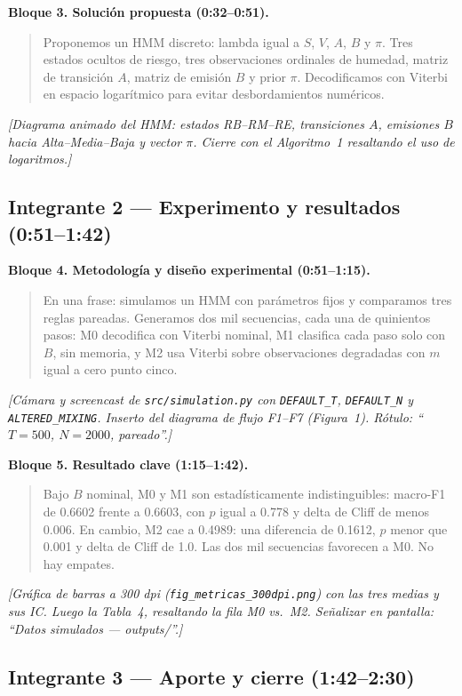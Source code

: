 \documentclass[11pt,letterpaper]{article}
\begin{document}
\medskip
\textbf{Bloque 3. Solución propuesta (0:32--0:51).}
\begin{quote}\small
Proponemos un HMM discreto: lambda igual a $S$, $V$, $A$, $B$ y $\pi$. Tres estados ocultos de riesgo, tres observaciones ordinales de humedad, matriz de transición $A$, matriz de emisión $B$ y prior $\pi$. Decodificamos con Viterbi en espacio logarítmico para evitar desbordamientos numéricos.
\end{quote}
\noindent\emph{[Diagrama animado del HMM: estados RB--RM--RE, transiciones $A$, emisiones $B$ hacia Alta--Media--Baja y vector $\pi$. Cierre con el Algoritmo~1 resaltando el uso de logaritmos.]}

\subsection*{Integrante 2 --- Experimento y resultados (0:51--1:42)}

\textbf{Bloque 4. Metodología y diseño experimental (0:51--1:15).}
\begin{quote}\small
En una frase: simulamos un HMM con parámetros fijos y comparamos tres reglas pareadas. Generamos dos mil secuencias, cada una de quinientos pasos: M0 decodifica con Viterbi nominal, M1 clasifica cada paso solo con $B$, sin memoria, y M2 usa Viterbi sobre observaciones degradadas con $m$ igual a cero punto cinco.
\end{quote}
\noindent\emph{[Cámara y screencast de \texttt{src/simulation.py} con \texttt{DEFAULT\_T}, \texttt{DEFAULT\_N} y \texttt{ALTERED\_MIXING}. Inserto del diagrama de flujo F1--F7 (Figura~1). Rótulo: ``$T=500$, $N=2000$, pareado''.]}

\medskip
\textbf{Bloque 5. Resultado clave (1:15--1:42).}
\begin{quote}\small
Bajo $B$ nominal, M0 y M1 son estadísticamente indistinguibles: macro-F1 de 0.6602 frente a 0.6603, con $p$ igual a 0.778 y delta de Cliff de menos 0.006. En cambio, M2 cae a 0.4989: una diferencia de 0.1612, $p$ menor que 0.001 y delta de Cliff de 1.0. Las dos mil secuencias favorecen a M0. No hay empates.
\end{quote}
\noindent\emph{[Gráfica de barras a 300 dpi (\texttt{fig\_metricas\_300dpi.png}) con las tres medias y sus IC. Luego la Tabla~4, resaltando la fila M0 vs.\ M2. Señalizar en pantalla: ``Datos simulados --- outputs/''.]}

\subsection*{Integrante 3 --- Aporte y cierre (1:42--2:30)}
\end{document}
